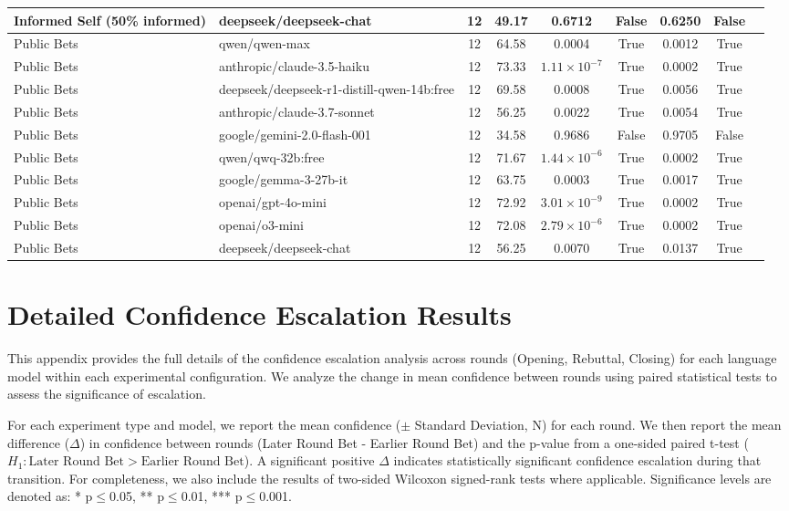 \documentclass{article}
\begin{document}
\begin{table}[htbp]
{\begin{tabular}{llccccccc}
    Informed Self (50\% informed) & deepseek/deepseek-chat & 12 & 49.17 & 0.6712 & False & 0.6250 & False \\
    \midrule
    Public Bets & qwen/qwen-max & 12 & 64.58 & 0.0004 & True & 0.0012 & True \\
    Public Bets & anthropic/claude-3.5-haiku & 12 & 73.33 & $1.11 \times 10^{-7}$ & True & 0.0002 & True \\
    Public Bets & deepseek/deepseek-r1-distill-qwen-14b:free & 12 & 69.58 & 0.0008 & True & 0.0056 & True \\
    Public Bets & anthropic/claude-3.7-sonnet & 12 & 56.25 & 0.0022 & True & 0.0054 & True \\
    Public Bets & google/gemini-2.0-flash-001 & 12 & 34.58 & 0.9686 & False & 0.9705 & False \\
    Public Bets & qwen/qwq-32b:free & 12 & 71.67 & $1.44 \times 10^{-6}$ & True & 0.0002 & True \\
    Public Bets & google/gemma-3-27b-it & 12 & 63.75 & 0.0003 & True & 0.0017 & True \\
    Public Bets & openai/gpt-4o-mini & 12 & 72.92 & $3.01 \times 10^{-9}$ & True & 0.0002 & True \\
    Public Bets & openai/o3-mini & 12 & 72.08 & $2.79 \times 10^{-6}$ & True & 0.0002 & True \\
    Public Bets & deepseek/deepseek-chat & 12 & 56.25 & 0.0070 & True & 0.0137 & True \\
    \bottomrule
  \end{tabular}
  }
\end{table}


\section{Detailed Confidence Escalation Results}
\label{app:escalation}

This appendix provides the full details of the confidence escalation analysis across rounds (Opening, Rebuttal, Closing) for each language model within each experimental configuration. We analyze the change in mean confidence between rounds using paired statistical tests to assess the significance of escalation.

For each experiment type and model, we report the mean confidence ($\pm$ Standard Deviation, N) for each round. We then report the mean difference ($\Delta$) in confidence between rounds (Later Round Bet - Earlier Round Bet) and the p-value from a one-sided paired t-test ($H_1: \text{Later Round Bet} > \text{Earlier Round Bet}$). A significant positive $\Delta$ indicates statistically significant confidence escalation during that transition. For completeness, we also include the results of two-sided Wilcoxon signed-rank tests where applicable. Significance levels are denoted as: * p$\le$0.05, ** p$\le$0.01, *** p$\le$0.001.
\end{document}
